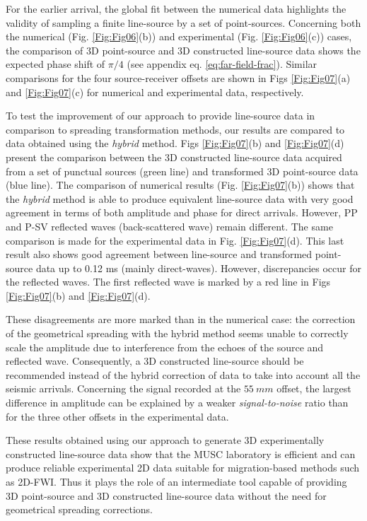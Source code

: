 \documentclass[extra,mreferee]{gji}
\begin{document}
For the earlier arrival, the global fit between the numerical data highlights the validity of sampling a finite line-source by a set of point-sources. Concerning both the numerical (Fig. \ref{Fig:Fig06}(b)) and experimental (Fig. \ref{Fig:Fig06}(c)) cases, the comparison of 3D point-source and 3D constructed line-source data shows the expected phase shift of $\pi/4$ (see appendix eq. \ref{eq:far-field-frac}). Similar comparisons for the four source-receiver offsets are shown in Figs \ref{Fig:Fig07}(a) and \ref{Fig:Fig07}(c) for numerical and experimental data, respectively.

To test the improvement of our approach to provide line-source data in comparison to spreading transformation methods, our results are compared to data obtained using the \textit{hybrid} method. Figs \ref{Fig:Fig07}(b) and \ref{Fig:Fig07}(d) present the comparison between the 3D constructed line-source data acquired from a set of punctual sources (green line) and transformed 3D point-source data (blue line). The comparison of numerical results (Fig. \ref{Fig:Fig07}(b)) shows that the \textit{hybrid} method is able to produce equivalent line-source data with very good agreement in terms of both amplitude and phase for direct arrivals. However, PP and P-SV reflected waves (back-scattered wave) remain different. The same comparison is made for the experimental data in Fig. \ref{Fig:Fig07}(d). This last result also shows good agreement between line-source and transformed point-source data up to 0.12 ms (mainly direct-waves). However, discrepancies occur for the reflected waves. The first reflected wave is marked by a red line in Figs \ref{Fig:Fig07}(b) and \ref{Fig:Fig07}(d).

These disagreements are more marked than in the numerical case: the correction of the geometrical spreading with the hybrid method seems unable to correctly scale the amplitude due to interference from the echoes of the source and reflected wave. Consequently, a 3D constructed line-source should be recommended instead of the hybrid correction of data to take into account all the seismic arrivals. Concerning the signal recorded at the $55\ mm$ offset, the largest difference in amplitude can be explained by a weaker \textit{signal-to-noise} ratio than for the three other offsets in the experimental data. 

These results obtained using our approach to generate 3D  experimentally constructed line-source data show that the MUSC laboratory is efficient and can produce reliable experimental 2D data suitable for migration-based methods such as 2D-FWI. Thus it plays the role of an intermediate tool capable of providing 3D point-source and 3D constructed line-source data without the need for geometrical spreading corrections.
\end{document}
